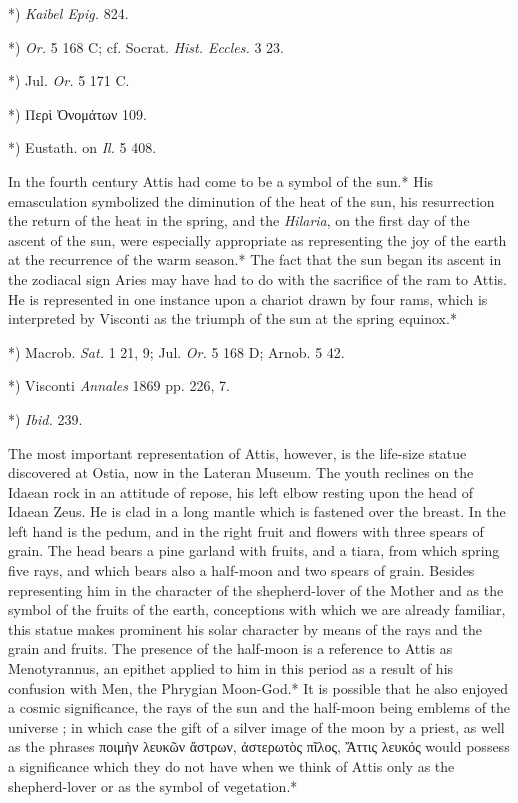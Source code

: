 \documentclass[a4paper, 11pt, oneside, polutonikogreek, english]{article}
\begin{document}
*) \emph{Kaibel Epig.} 824.

*) \emph{Or.} 5 168 C; cf. Socrat. \emph{Hist. Eccles.} 3 23.

*) Jul. \emph{Or.} 5 171 C.

*) Περὶ Ὀνομάτων 109.

*) Eustath. on \emph{Il.} 5 408.

In the fourth century Attis had come to be a symbol of the sun.* His emasculation symbolized the diminution of the heat of the sun, his resurrection the return of the heat in the spring, and the \emph{Hilaria}, on the first day of the ascent of the sun, were especially appropriate as representing the joy of the earth at the recurrence of the warm season.* The fact that the sun began its ascent in the zodiacal sign Aries may have had to do with the sacrifice of the ram to Attis. He is represented in one instance upon a chariot drawn by four rams, which is interpreted by Visconti as the triumph of the sun at the spring equinox.*

*) Macrob. \emph{Sat.} 1 21, 9; Jul. \emph{Or.} 5 168 D; Arnob. 5 42.

*) Visconti \emph{Annales} 1869 pp. 226, 7.

*) \emph{Ibid.} 239.

The most important representation of Attis, however, is the life-size statue discovered at Ostia, now in the Lateran Museum. The youth reclines on the Idaean rock in an attitude of repose, his left elbow resting upon the head of Idaean Zeus. He is clad in a long mantle which is fastened over the breast. In the left hand is the pedum, and in the right fruit and flowers with three spears of grain. The head bears a pine garland with fruits, and a tiara, from which spring five rays, and which bears also a half-moon and two spears of grain. Besides representing him in the character of the shepherd-lover of the Mother and as the symbol of the fruits of the earth, conceptions with which we are already familiar, this statue makes prominent his solar character by means of the rays and the grain and fruits. The presence of the half-moon is a reference to Attis as Menotyrannus, an epithet applied to him in this period as a result of his confusion with Men, the Phrygian Moon-God.* It is possible that he also enjoyed a cosmic significance, the rays of the sun and the half-moon being emblems of the universe ; in which case the gift of a silver image of the moon by a priest, as well as the phrases ποιμὴν λευκῶν ἄστρων, ἀστερωτὸς πῖλος, Ἄττις λευκός would possess a significance which they do not have when we think of Attis only as the shepherd-lover or as the symbol of vegetation.*
\end{document}
